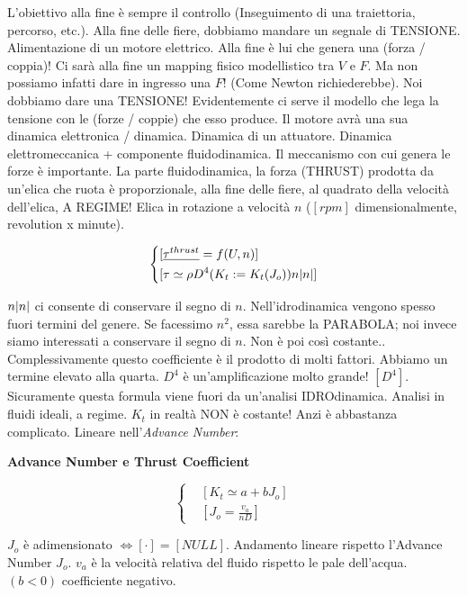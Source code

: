 L'obiettivo alla fine è sempre il controllo (Inseguimento di una traiettoria, percorso, etc.). Alla fine delle fiere, dobbiamo mandare un segnale di TENSIONE. Alimentazione di un motore elettrico. Alla fine è lui che genera una (forza / coppia)! Ci sarà alla fine un mapping fisico modellistico tra $V$ e $F$. Ma non possiamo infatti dare in ingresso una $F$! (Come Newton richiederebbe). Noi dobbiamo dare una TENSIONE! Evidentemente ci serve il modello che lega la tensione con le (forze / coppie) che esso produce. Il motore avrà una sua dinamica elettronica / dinamica. Dinamica di un attuatore. Dinamica elettromeccanica + componente fluidodinamica. Il meccanismo con cui genera le forze è importante. La parte fluidodinamica, la forza (THRUST) prodotta da un'elica che ruota è proporzionale, alla fine delle fiere, al quadrato della velocità dell'elica, A REGIME! Elica in rotazione a velocità $n$ ($[rpm]$ dimensionalmente, revolution x minute). 

\[
	\left\{
	\begin{aligned}
	&[\underline{\tau^{thrust}} = f(U,n)]\\
	&[\tau \simeq \rho D^4 (K_t := K_t(J_o))n\lvert n\rvert]
	\end{aligned}
	\right.
\]

$n\lvert n\rvert$ ci consente di conservare il segno di $n$. Nell'idrodinamica vengono spesso fuori termini del genere. Se facessimo $n^2$, essa sarebbe la PARABOLA; noi invece siamo interessati a conservare il segno di $n$. Non è poi così costante.. Complessivamente questo coefficiente è il prodotto di molti fattori. Abbiamo un termine elevato alla quarta. $D^4$ è un'amplificazione molto grande! $[D^4]$. Sicuramente questa formula viene fuori da un'analisi IDROdinamica. Analisi in fluidi ideali, a regime. $K_t$ in realtà NON è costante! Anzi è abbastanza complicato. Lineare nell'\textit{Advance Number}:

\begin{defn}{\textbf{Advance Number e Thrust Coefficient}}

\[	
	\left\{
	\begin{aligned}
	&[K_t \simeq a + bJ_o]\\
	&[J_o = \frac{v_a}{nD}]
	\end{aligned}
	\right.
\]

\end{defn}

$J_o$ è adimensionato $\iff [\mathord{\cdot}] = [NULL]$. Andamento lineare rispetto l'Advance Number $J_o$. $v_a$ è la velocità relativa del fluido rispetto le pale dell'acqua. $(b<0)$ coefficiente negativo. 

